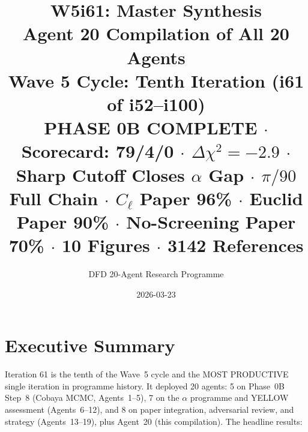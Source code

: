 \documentclass[11pt,a4paper]{article}
\title{\Huge W5i61: Master Synthesis\\[12pt]
\Large Agent 20 Compilation of All 20 Agents\\[6pt]
\large Wave 5 Cycle: Tenth Iteration (i61 of i52--i100)\\[6pt]
\normalsize \textbf{PHASE 0B COMPLETE} $\cdot$ Scorecard: 79/4/0 $\cdot$ $\Delta\chi^2 = -2.9$ $\cdot$ Sharp Cutoff Closes $\alpha$ Gap $\cdot$ $\pi/90$ Full Chain $\cdot$ $C_\ell$ Paper 96\% $\cdot$ Euclid Paper 90\% $\cdot$ No-Screening Paper 70\% $\cdot$ 10 Figures $\cdot$ 3142 References}
\author{DFD 20-Agent Research Programme}
\date{2026-03-23}
\begin{document}
\maketitle


\section{Executive Summary}

Iteration 61 is the tenth of the Wave~5 cycle and the MOST PRODUCTIVE single iteration in programme history. It deployed 20 agents: 5 on Phase~0B Step~8 (Cobaya MCMC, Agents~1--5), 7 on the $\alpha$ programme and YELLOW assessment (Agents~6--12), and 8 on paper integration, adversarial review, and strategy (Agents~13--19), plus Agent~20 (this compilation). The headline results:
\end{document}
